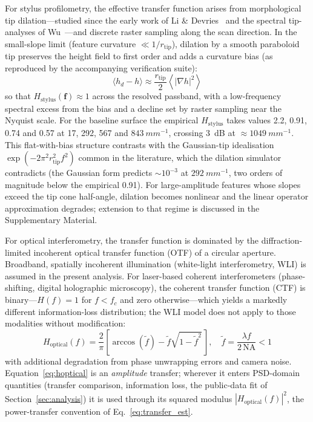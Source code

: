 \documentclass[review,12pt]{elsarticle}
\begin{document}
For stylus profilometry, the effective transfer function arises from morphological tip dilation---studied since the early work of Li \& Devries~\cite{li1984computer} and the spectral tip-analyses of Wu~\cite{wu1999spectral,wu2000spectral}---and discrete raster sampling along the scan direction. In the small-slope limit (feature curvature $\ll 1/r_\mathrm{tip}$), dilation by a smooth paraboloid tip preserves the height field to first order and adds a curvature bias (as reproduced by the accompanying verification suite):
\begin{equation}
    \langle h_d - h \rangle \approx \frac{r_\mathrm{tip}}{2}\left\langle |\nabla h|^2 \right\rangle
    \label{eq:hstylus}
\end{equation}
so that $H_\mathrm{stylus}(\mathbf{f}) \approx 1$ across the resolved passband, with a low-frequency spectral excess from the bias and a decline set by raster sampling near the Nyquist scale. For the baseline surface the empirical $H_\mathrm{stylus}$ takes values 2.2, 0.91, 0.74 and 0.57 at 17, 292, 567 and $\SI{843}{mm^{-1}}$, crossing \SI{3}{dB} at $\approx\SI{1049}{mm^{-1}}$. This flat-with-bias structure contrasts with the Gaussian-tip idealisation $\exp(-2\pi^2 r_\mathrm{tip}^2 f^2)$ common in the literature, which the dilation simulator contradicts (the Gaussian form predicts $\sim10^{-3}$ at $\SI{292}{mm^{-1}}$, two orders of magnitude below the empirical 0.91). For large-amplitude features whose slopes exceed the tip cone half-angle, dilation becomes nonlinear and the linear operator approximation degrades; extension to that regime is discussed in the Supplementary Material.

For optical interferometry, the transfer function is dominated by the diffraction-limited incoherent optical transfer function (OTF) of a circular aperture. Broadband, spatially incoherent illumination (white-light interferometry, WLI) is assumed in the present analysis. For laser-based coherent interferometers (phase-shifting, digital holographic microscopy), the coherent transfer function (CTF) is binary---$H(f)=1$ for $f<f_c$ and zero otherwise---which yields a markedly different information-loss distribution; the WLI model does not apply to those modalities without modification:
\begin{equation}
    H_\mathrm{optical}(f) = \frac{2}{\pi}\!\left[\arccos(\tilde{f}) - \tilde{f}\sqrt{1-\tilde{f}^2}\,\right],\quad \tilde{f} = \frac{\lambda f}{2\,\mathrm{NA}} < 1
    \label{eq:hoptical}
\end{equation}
with additional degradation from phase unwrapping errors and camera noise. Equation~\ref{eq:hoptical} is an \emph{amplitude} transfer; wherever it enters PSD-domain quantities (transfer comparison, information loss, the public-data fit of Section~\ref{sec:analysis}) it is used through its squared modulus $|H_\mathrm{optical}(f)|^2$, the power-transfer convention of Eq.~\ref{eq:transfer_est}.
\end{document}

